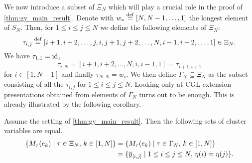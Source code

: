 We now introduce a subset of $\Xi_N$ which will play a crucial role in the proof of
\cref{thm:gy_main_result}. Denote with $w_\circ \overset{\mathrm{def}}{=} [N, N-1, \dots, 1]$ the longest
element of $S_N$. Then, for $1 \leq i \leq j \leq N$ we define the following elements
of $\Xi_N$:
\begin{equation*}
	\tau_{i,j} \overset{\mathrm{def}}{=} [i+1, i+2, \dots, j, i ,j+1, j+2, \dots, N, i-1,i-2, \dots, 1] \in \Xi_N.
\end{equation*}
%
We have $\tau_{1,1} = \operatorname{id}$,
\begin{equation*}
	\tau_{i, N} = [i+1, i+2, \dots, N, i, i-1, 1] = \tau_{i+1, i+1}
\end{equation*}
%
for $i \in [1, N-1]$ and finally $\tau_{N, N} = w_\circ$. We then define $\Gamma_N
	\subseteq \Xi_N$ as the subset consisting of all the $\tau_{i,j}$ for $1 \leq i \leq j
	\leq N$. Looking only at CGL extension presentations obtained from elements of
$\Gamma_N$ turns out to be enough. This is already illustrated by the following
corollary.
\begin{corollary}
	Assume the setting of \cref{thm:gy_main_result}. Then the following sets of cluster variables are equal.
	\begin{align*}
		\{M_\tau(e_k) \mid \tau \in \Xi_N,\, k \in [1, N]\}
		 & = \{M_\tau(e_k) \mid \tau \in \Gamma_N,\, k \in [1, N]\}             \\
		 & = \{\overline{y}_{[i,j]} \mid 1 \leq i \leq j \leq N, \, \eta(i) = \eta(j)\}.
	\end{align*}
\end{corollary}
